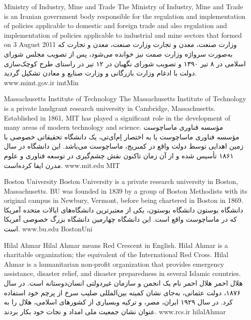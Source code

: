 
\instituteC
{Ministry of Industry, Mine and Trade}
{The Ministry of Industry, Mine and Trade is an Iranian government body responsible for the regulation and implementation of
policies applicable to domestic and foreign trade and also regulation and implementation of policies applicable to industrial
and mine sectors that formed on 3 August 2011}
{}
{وزارت صنعت، معدن و تجارت}
{وزارت صنعت، معدن و تجارت که به‌صورت سرواژه وزارت صمت نیز خوانده می‌شود،
پس از تصویب مجلس شورای اسلامی در ۸ تیر ۱۳۹۰ و تصویب شورای نگهبان در ۱۲ تیر
در راستای طرح کوچک‌سازی دولت با ادغام وزارت بازرگانی و وزارت صنایع و معادن تشکیل گردید.}
{}
{www.mimt.gov.ir}
{imtMin}

\instituteC
{Massachusetts Institute of Technology}
{The Massachusetts Institute of Technology is a private landgrant research university in Cambridge, Massachusetts.
Established in 1861, MIT has played a significant role in the development of many areas of modern technology and science.}
{}
{مؤسسه فناوری ماساچوست}
{مؤسسه فناوری ماساچوست یا به اختصار اِم‌آی‌تی، یک دانشگاه تحقیقاتی خصوصی با زمین اهدایی توسط دولت واقع در کمبریج، ماساچوست می‌باشد.
این دانشگاه در سال ۱۸۶۱ تأسیس شده و از آن زمان تاکنون نقش چشم‌گیری در توسعه فناوری و علوم مدرن ایفا کرده‌است.}
{}
{www.mit.edu}
{MIT}

\instituteC
{Boston University}
{Boston University is a private research university in Boston, Massachusetts.
BU was founded in 1839 by a group of Boston Methodists with its original campus
in Newbury, Vermont, before being chartered in Boston in 1869.}
{}
{دانشگاه بوستون}
{دانشگاه بوستون، یکی از معتبرترین دانشگاه‌های ایالات متحده آمریکا که در ماساچوست واقع است.
این دانشگاه چهارمین دانشگاه بزرگ خصوصی آمریکا است.}
{}
{www.bu.edu}
{BostonUni}

\instituteC
{Hilal Ahmar}
{Hilal Ahmar means Red Crescent in English. Hilal Ahmar is a charitable organization; the equivalent of the International Red Cross.
Hilal Ahmar is a humanitarian non-profit organization that provides emergency assistance, disaster relief, and disaster preparedness
in several Islamic countries.}
{}
{هلال احمر}
{هلال احمر نام یک انجمن و سازمان غیردولتی انسان‌دوستانه است. در سال ۱۸۷۶، دولت عثمانی، به‌جای نشان کمیته بین‌المللی صلیب سرخ از پرچم خود استفاده کرد.
در سال ۱۹۲۹ ایران، مصر، و ترکیه وبسیاری از کشورهای اسلامی، هلال را به عنوان نشان جمعیت ملی امداد و نجات خود بکار بردند.}
{}
{www.rcs.ir}
{hilalAhmar}
